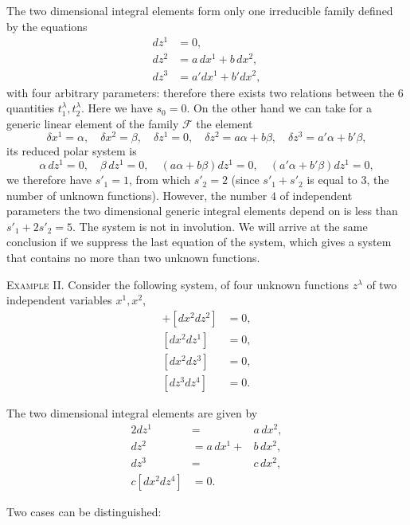 \documentclass[leqno,11pt]{book}
\numberwithin{equation}{chapter}
\theoremstyle{shape1}
\theoremstyle{shape0}
\theoremstyle{shape2}
\theoremstyle{definition}
\begin{document}
The two dimensional integral elements form only one irreducible family defined by the equations
\begin{align*}
  dz^{1}&=0,\\
  dz^{2}&=a\,dx^{1}+b\,dx^{2},\\
  dz^{3}&=a'dx^{1}+b'dx^{2},
\end{align*}
with four arbitrary parameters: therefore there exists two relations between the $6$ quantities $t_{1}^{\lambda},t_{2}^{\lambda}$. Here we have $s_{0}=0$. On the other hand we can take for a generic linear element of the family $\mathcal{F}$ the element
\[
\delta x^{1}=\alpha,\quad \delta x^{2}=\beta,\quad \delta z^{1}=0,\quad \delta z^{2}=a\alpha+b\beta,\quad \delta z^{3}=a'\alpha+b'\beta,
\]
its reduced polar system is
\[
\alpha\,dz^{1}=0,\quad \beta\, dz^{1}=0,\quad(a\alpha+b\beta)dz^{1}=0,\quad(a'\alpha+b'\beta)dz^{1}=0,
\]
we therefore have $s'_{1}=1$, from which $s'_{2}=2$ (since $s'_{1}+s'_{2}$ is equal to $3$, the number of unknown functions). However, the number $4$ of independent parameters the two dimensional generic integral elements depend on is less than $s'_{1}+2s'_{2}=5$. The system is not in involution. We will arrive at the same conclusion if we suppress the last equation of the system, which gives a system that contains no more than two unknown functions.


\vspace{12pt}\fsec \textsc{Example II.} Consider the following system, of four unknown functions $z^{\lambda}$ of two independent variables $x^{1},x^{2}$,
\begin{align*}
  [dx^{1}dz^{1}]+[dx^{2}dz^{2}]&=0,\\
  [dx^{2}dz^{1}]&=0,\\
  [dx^{2}dz^{3}]&=0,\\
  [dz^{3}dz^{4}]&=0.
\end{align*}

The two dimensional integral elements are given by
\begin{alignat*}{2}
  dz^{1}&=&a\,dx^{2},\\
  dz^{2}&=a\,dx^{1}+&b\,dx^{2},\\
  dz^{3}&=&c\,dx^{2},\\
  c[dx^{2}dz^{4}]&=0.&
\end{alignat*}

Two cases can be distinguished:
\end{document}

